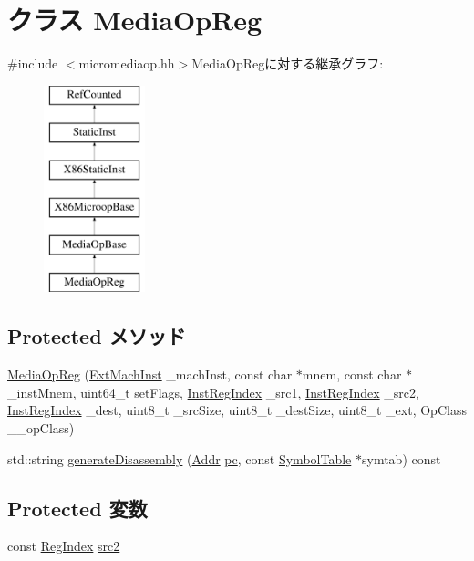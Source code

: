 \hypertarget{classX86ISA_1_1MediaOpReg}{
\section{クラス MediaOpReg}
\label{classX86ISA_1_1MediaOpReg}
}


{\ttfamily \#include $<$micromediaop.hh$>$}MediaOpRegに対する継承グラフ:\begin{figure}[H]
\begin{center}
\leavevmode
\includegraphics[height=6cm]{classX86ISA_1_1MediaOpReg}
\end{center}
\end{figure}
\subsection*{Protected メソッド}
\begin{DoxyCompactItemize}
\item 
\hyperlink{classX86ISA_1_1MediaOpReg_ab20ae387d3347d43b4fb4ed2171e527d}{MediaOpReg} (\hyperlink{structX86ISA_1_1ExtMachInst}{ExtMachInst} \_\-machInst, const char $\ast$mnem, const char $\ast$\_\-instMnem, uint64\_\-t setFlags, \hyperlink{structX86ISA_1_1InstRegIndex}{InstRegIndex} \_\-src1, \hyperlink{structX86ISA_1_1InstRegIndex}{InstRegIndex} \_\-src2, \hyperlink{structX86ISA_1_1InstRegIndex}{InstRegIndex} \_\-dest, uint8\_\-t \_\-srcSize, uint8\_\-t \_\-destSize, uint8\_\-t \_\-ext, OpClass \_\-\_\-opClass)
\item 
std::string \hyperlink{classX86ISA_1_1MediaOpReg_a95d323a22a5f07e14d6b4c9385a91896}{generateDisassembly} (\hyperlink{base_2types_8hh_af1bb03d6a4ee096394a6749f0a169232}{Addr} \hyperlink{namespaceX86ISA_aecb63c74e066ecd98e04d057e39028c9}{pc}, const \hyperlink{classSymbolTable}{SymbolTable} $\ast$symtab) const 
\end{DoxyCompactItemize}
\subsection*{Protected 変数}
\begin{DoxyCompactItemize}
\item 
const \hyperlink{classStaticInst_a36d25e03e43fa3bb4c5482cbefe5e0fb}{RegIndex} \hyperlink{classX86ISA_1_1MediaOpReg_ae5f4f8a3a7b6e717a2cff2990c4ecfff}{src2}
\end{DoxyCompactItemize}


